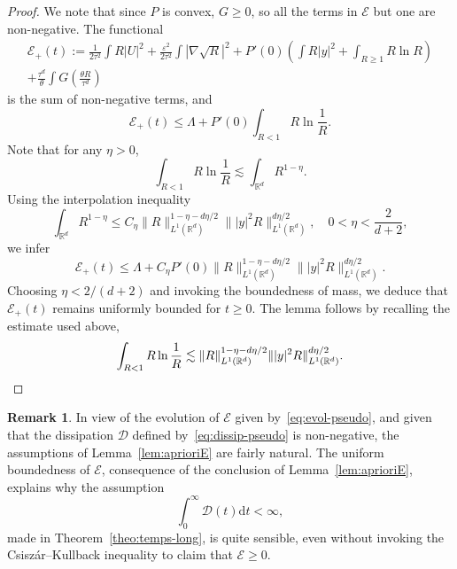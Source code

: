 \documentclass[10pt]{amsart}
\theoremstyle{definition}\newtheorem{defi}[theo]{Definition}\newtheorem{rema}[theo]{Remark}\newtheorem{exam}[theo]{Example}\newtheorem{exem}[theo]{Example}\newtheorem{nota}[theo]{Notation}
\newcommand*\R{\mathbb{R}}
\newcommand*\dd {\mathrm{d}}
\newcommand*\<{\left\langle}
\renewcommand*\>{\right\rangle}
\renewcommand*\le{\leqslant}
\renewcommand*\ge{\geqslant}
\newcommand*\eps{\varepsilon}
\begin{document}
\begin{proof}
We note that since $P$ is convex, $G\ge0 $, so all the terms in $\mathcal E$ but one are non-negative. The functional
\begin{multline*}
\mathcal E_+(t) := \frac{1}{2\tau^2}\int R|U|^2+\frac{\eps^2}{2\tau^2} \int|\nabla \sqrt R|^2 +P'(0)\left(\int R|y|^2 + \int_{R\ge 1} R \ln R\right) \\
+ \frac{\tau^d}{\theta}\int G\left(\frac{\theta R}{\tau^d}\right)
\end{multline*}
is the sum of non-negative terms, and
\begin{equation*}
\mathcal E_+(t)\le \Lambda+ P'(0)\int_{R< 1} R \ln \frac{1}{R}.
\end{equation*}
Note that for any $\eta>0$,
\begin{equation*}
\int_{R< 1} R \ln \frac{1}{R} \lesssim \int_{\R^d} R^{1-\eta}.
\end{equation*}
Using the interpolation inequality
\begin{equation*}
\int_{\R^d} R^{1-\eta} \le C_{\eta}
\|R\|_{L^1(\R^d)}^{1-\eta-d\eta/2}\||y|^2 R\|_{L^1(\R^d)}^{d\eta/2},\quad 0<\eta<\frac{2}{d+2},
\end{equation*}
we infer
\begin{equation*}
\mathcal E_+(t)\le \Lambda+ C_\eta P'(0)\|R\|_{L^1(\R^d)}^{1-\eta-d\eta/2}\||y|^2 R\|_{L^1(\R^d)}^{d\eta/2}.
\end{equation*}
Choosing $\eta<2/(d+2)$ and invoking the boundedness of mass, we deduce that $ \mathcal E_+(t)$ remains uniformly bounded for $t \ge 0$. The lemma follows by recalling the estimate used above,
\begin{equation*}
\int_{R< 1} R \ln \frac{1}{R} \lesssim
\|R\|_{L^1(\R^d)}^{1-\eta-d\eta/2}\||y|^2 R\|_{L^1(\R^d)}^{d\eta/2}.\qedhere
\end{equation*}
\end{proof}

\begin{rema}
In view of the evolution of $\mathcal E$ given by~\eqref{eq:evol-pseudo}, and given that the dissipation $\mathcal D$ defined by~\eqref{eq:dissip-pseudo} is non-negative, the assumptions of Lemma~\ref{lem:aprioriE} are fairly natural. The uniform boundedness of $\mathcal E$, consequence of the conclusion of Lemma~\ref{lem:aprioriE}, explains why the assumption
\[
\int_0^\infty \mathcal D(t)\dd t<\infty,
\]
made in Theorem~\ref{theo:temps-long}, is quite sensible, even without invoking the Csisz\'ar--Kullback inequality to claim that $\mathcal E\ge 0$.
\end{rema}
\end{document}
